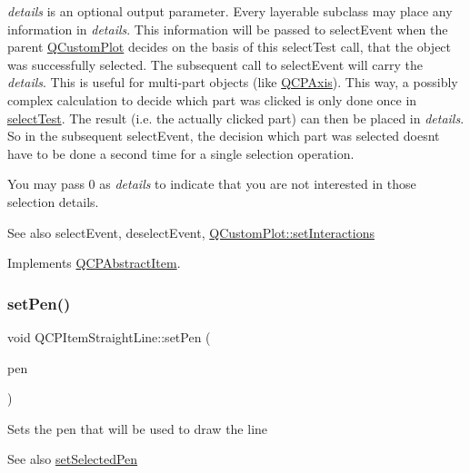 {\itshape details} is an optional output parameter. Every layerable subclass may place any information in {\itshape details}. This information will be passed to select\+Event when the parent \mbox{\hyperlink{class_q_custom_plot}{Q\+Custom\+Plot}} decides on the basis of this select\+Test call, that the object was successfully selected. The subsequent call to select\+Event will carry the {\itshape details}. This is useful for multi-\/part objects (like \mbox{\hyperlink{class_q_c_p_axis}{Q\+C\+P\+Axis}}). This way, a possibly complex calculation to decide which part was clicked is only done once in \mbox{\hyperlink{class_q_c_p_item_straight_line_a1e5d99d79efb5871600c72bcd2891a0f}{select\+Test}}. The result (i.\+e. the actually clicked part) can then be placed in {\itshape details}. So in the subsequent select\+Event, the decision which part was selected doesn\textquotesingle{}t have to be done a second time for a single selection operation.

You may pass 0 as {\itshape details} to indicate that you are not interested in those selection details.

\begin{DoxySeeAlso}{See also}
select\+Event, deselect\+Event, \mbox{\hyperlink{class_q_custom_plot_a5ee1e2f6ae27419deca53e75907c27e5}{Q\+Custom\+Plot\+::set\+Interactions}} 
\end{DoxySeeAlso}


Implements \mbox{\hyperlink{class_q_c_p_abstract_item_a96d522d10ffc0413b9a366c6f7f0476b}{Q\+C\+P\+Abstract\+Item}}.

\mbox{\label{class_q_c_p_item_straight_line_a9f36c9c9e60d7d9ac084c80380ac8601}} 
\subsubsection{\texorpdfstring{set\+Pen()}{setPen()}}
{\footnotesize\ttfamily void Q\+C\+P\+Item\+Straight\+Line\+::set\+Pen (\begin{DoxyParamCaption}\item[{const Q\+Pen \&}]{pen }\end{DoxyParamCaption})}

Sets the pen that will be used to draw the line

\begin{DoxySeeAlso}{See also}
\mbox{\hyperlink{class_q_c_p_item_straight_line_a5c33559498d33543fa95cf0a36e851ff}{set\+Selected\+Pen}} 
\end{DoxySeeAlso}
\mbox{\label{class_q_c_p_item_straight_line_a5c33559498d33543fa95cf0a36e851ff}} 
